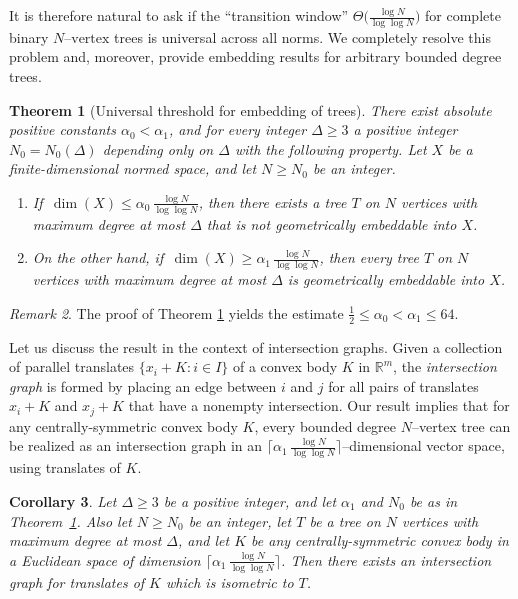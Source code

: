 \documentclass[11pt,leqno]{amsart}
\newtheorem{theorem}{Theorem}[section]
\newtheorem{corollary}[theorem]{Corollary}
\theoremstyle{remark}
\newtheorem{remark}[theorem]{Remark}
\theoremstyle{plain}
\newcommand{\R}{\mathbb{R}}
\begin{document}
It is therefore natural to ask if the ``transition window'' $\Theta\big(\frac{\log N}{\log\log N}\big)$ for complete binary $N\text{--vertex}$ trees is universal across all norms. We completely resolve this problem and, moreover, provide embedding results for arbitrary bounded degree trees.

\begin{theorem}[Universal threshold for embedding of trees] \label{thm:complete-tree-embedding}
There exist absolute positive constants $\alpha_0<\alpha_1$, and for every integer $\Delta\geqslant 3$ a positive integer $N_0=N_0(\Delta)$
depending only on $\Delta$ with the following property. Let $X$ be a finite-dimensional normed space, and let $N\geqslant N_0$ be an integer.
\begin{enumerate}
\item[$(A)$] If\, $\dim (X)\leqslant \alpha_0\, \frac{\log N}{\log\log N}$, then there exists a tree $T$ on $N$ vertices
with maximum degree at most $\Delta$ that is not geometrically embeddable into $X$.
\item [$(B)$] On the other hand, if\, $\dim (X)\geqslant \alpha_1\, \frac{\log N}{\log\log N}$, then every tree $T$ on $N$ vertices
with maximum degree at most $\Delta$ is geometrically embeddable into $X$.
\end{enumerate}
\end{theorem}

\begin{remark} \label{rem1.1}
The proof of Theorem \ref{thm:complete-tree-embedding} yields the estimate $\frac12 \leqslant \alpha_0 <\alpha_1\leqslant 64$.
\end{remark}

Let us discuss the result in the context of intersection graphs. Given a collection of parallel translates $\{x_i+K\colon i\in I\}$ of a convex body $K$ in $\R^m$, the {\it intersection graph} is formed by placing an edge between $i$ and $j$ for all pairs of translates $x_i+K$ and $x_j+K$ that have a nonempty intersection. Our result implies that for any centrally-symmetric convex body $K$, every bounded degree $N$--vertex tree can be realized as an intersection graph in an $\big\lceil\alpha_1\, \frac{\log N}{\log\log N}\big\rceil$--dimensional vector space, using translates of $K$.

\begin{corollary}
Let $\Delta\geqslant 3$ be a positive integer, and let $\alpha_1$ and $N_0$ be as in Theorem~\ref{thm:complete-tree-embedding}. Also let $N\geqslant N_0$ be an integer, let $T$ be a tree on $N$ vertices with maximum degree at most $\Delta$, and let $K$ be any centrally-symmetric convex body in a Euclidean space of dimension $\big\lceil\alpha_1\, \frac{\log N}{\log\log N}\big\rceil$. Then there exists an intersection graph for translates of $K$ which is isometric to $T$.
\end{corollary}
\end{document}
